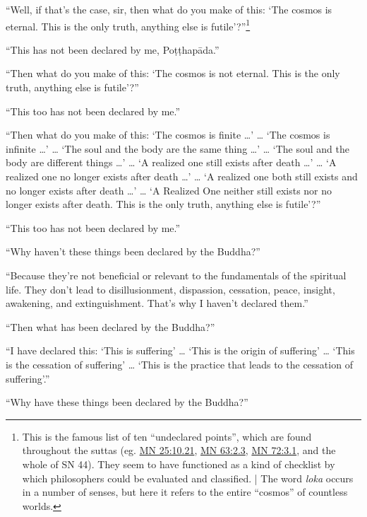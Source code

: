 \documentclass[12pt,openany]{book}%
\begin{document}
“Well, if that’s the case, sir, then what do you make of this: ‘The cosmos is eternal. This is the only truth, anything else is futile’?”\footnote{This is the famous list of ten “undeclared points”, which are found throughout the suttas (eg. \href{https://suttacentral.net/mn25/en/sujato\#10.21}{MN 25:10.21}, \href{https://suttacentral.net/mn63/en/sujato\#2.3}{MN 63:2.3}, \href{https://suttacentral.net/mn72/en/sujato\#3.1}{MN 72:3.1}, and the whole of SN 44). They seem to have functioned as a kind of checklist by which philosophers could be evaluated and classified. | The word \textit{loka} occurs in a number of senses, but here it refers to the entire “cosmos” of countless worlds. } 

“This has not been declared by me, \textsanskrit{Poṭṭhapāda}.” 

“Then what do you make of this: ‘The cosmos is not eternal. This is the only truth, anything else is futile’?” 

“This too has not been declared by me.” 

“Then what do you make of this: ‘The cosmos is finite …’ … ‘The cosmos is infinite …’ … ‘The soul and the body are the same thing …’ … ‘The soul and the body are different things …’ … ‘A realized one still exists after death …’ … ‘A realized one no longer exists after death …’ … ‘A realized one both still exists and no longer exists after death …’ … ‘A Realized One neither still exists nor no longer exists after death. This is the only truth, anything else is futile’?” 

“This too has not been declared by me.” 

“Why haven’t these things been declared by the Buddha?” 

“Because they’re not beneficial or relevant to the fundamentals of the spiritual life. They don’t lead to disillusionment, dispassion, cessation, peace, insight, awakening, and extinguishment. That’s why I haven’t declared them.” 

“Then what has been declared by the Buddha?” 

“I have declared this: ‘This is suffering’ … ‘This is the origin of suffering’ … ‘This is the cessation of suffering’ … ‘This is the practice that leads to the cessation of suffering’.” 

“Why have these things been declared by the Buddha?” 
\end{document}

